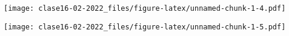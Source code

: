 \documentclass[
]{article}
\newenvironment{Shaded}{\begin{snugshade}}{\end{snugshade}}
\newcommand{\AttributeTok}[1]{\textcolor[rgb]{0.77,0.63,0.00}{#1}}
\newcommand{\DecValTok}[1]{\textcolor[rgb]{0.00,0.00,0.81}{#1}}
\newcommand{\FunctionTok}[1]{\textcolor[rgb]{0.00,0.00,0.00}{#1}}
\newcommand{\NormalTok}[1]{#1}
\newcommand{\SpecialCharTok}[1]{\textcolor[rgb]{0.00,0.00,0.00}{#1}}
\newcommand{\StringTok}[1]{\textcolor[rgb]{0.31,0.60,0.02}{#1}}
\begin{document}
\texttt{[image: clase16-02-2022\_files/figure-latex/unnamed-chunk-1-4.pdf]}

\begin{Shaded}
\end{Shaded}

\texttt{[image: clase16-02-2022\_files/figure-latex/unnamed-chunk-1-5.pdf]}
\end{document}
